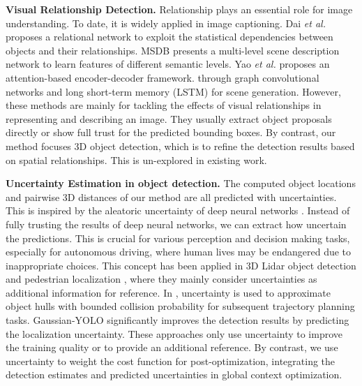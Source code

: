 \documentclass[10pt,twocolumn,letterpaper]{article}
\begin{document}
\vspace{2pt}\noindent\textbf{Visual Relationship Detection.}\hspace{5pt}
Relationship plays an essential role for image understanding. To date, it is widely applied in image captioning.
Dai \textit{et al.} \cite{dai2017detecting} proposes a relational network to exploit the statistical dependencies between objects and their relationships.
MSDB \cite{Li_2017_ICCV} presents a multi-level scene description network to learn features of different semantic levels.
Yao \textit{et al.} \cite{Yao_2018_ECCV} proposes an attention-based encoder-decoder framework. through graph convolutional networks and long short-term memory (LSTM) for scene generation.
However, these methods are mainly for tackling the effects of visual relationships in representing and describing an image. They usually extract object proposals directly or show full trust for the predicted bounding boxes. By contrast, our method focuses 3D object detection, which is to refine the detection results based on spatial relationships. This is un-explored in existing work.

\vspace{2pt}\noindent\textbf{Uncertainty Estimation in object detection.}\hspace{5pt}
The computed object locations and pairwise 3D distances of our method are all predicted with uncertainties. This is inspired by the aleatoric uncertainty of deep neural networks \cite{gal2016uncertainty, kendall2017uncertainties}. Instead of fully trusting the results of deep neural networks, we can extract how uncertain the predictions. This is crucial for various perception and decision making tasks, especially for autonomous driving, where human lives may be endangered due to inappropriate choices. This concept has been applied in 3D Lidar object detection \cite{feng2018towards} and pedestrian localization \cite{bertoni2019monoloco}, where they mainly consider uncertainties as additional information for reference.
In \cite{wirges_capturing_2019}, uncertainty is used to approximate object hulls with bounded collision probability for subsequent trajectory planning tasks.
Gaussian-YOLO \cite{choi_gaussian_2019} significantly improves the detection results by predicting the localization uncertainty.
These approaches only use uncertainty to improve the training quality or to provide an additional reference. By contrast, we use uncertainty to weight the cost function for post-optimization, integrating the detection estimates and predicted uncertainties in global context optimization.
 
\end{document}
